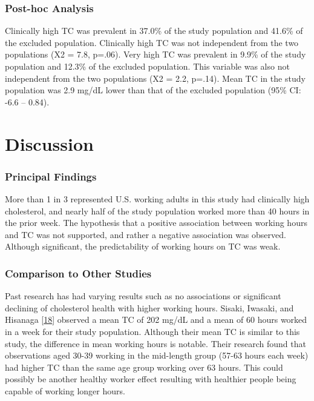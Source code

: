 \documentclass[]{elsarticle} %
\begin{document}
\hypertarget{post-hoc-analysis}{%
\subsubsection{Post-hoc Analysis}\label{post-hoc-analysis}}

Clinically high TC was prevalent in 37.0\% of the study population and
41.6\% of the excluded population. Clinically high TC was not
independent from the two populations (X2 = 7.8, p=.06). Very high TC was
prevalent in 9.9\% of the study population and 12.3\% of the excluded
population. This variable was also not independent from the two
populations (X2 = 2.2, p=.14). Mean TC in the study population was 2.9
mg/dL lower than that of the excluded population (95\% CI: -6.6 --
0.84).

\hypertarget{discussion}{%
\section{Discussion}\label{discussion}}

\hypertarget{principal-findings}{%
\subsubsection{Principal Findings}\label{principal-findings}}

More than 1 in 3 represented U.S. working adults in this study had
clinically high cholesterol, and nearly half of the study population
worked more than 40 hours in the prior week. The hypothesis that a
positive association between working hours and TC was not supported, and
rather a negative association was observed. Although significant, the
predictability of working hours on TC was weak.

\hypertarget{comparison-to-other-studies}{%
\subsubsection{Comparison to Other
Studies}\label{comparison-to-other-studies}}

Past research has had varying results such as no associations or
significant declining of cholesterol health with higher working hours.
Sisaki, Iwasaki, and Hisanaga
{[}\protect\hyperlink{ref-sasaki1999}{18}{]} observed a mean TC of 202
mg/dL and a mean of 60 hours worked in a week for their study
population. Although their mean TC is similar to this study, the
difference in mean working hours is notable. Their research found that
observations aged 30-39 working in the mid-length group (57-63 hours
each week) had higher TC than the same age group working over 63 hours.
This could possibly be another healthy worker effect resulting with
healthier people being capable of working longer hours.
\end{document}
